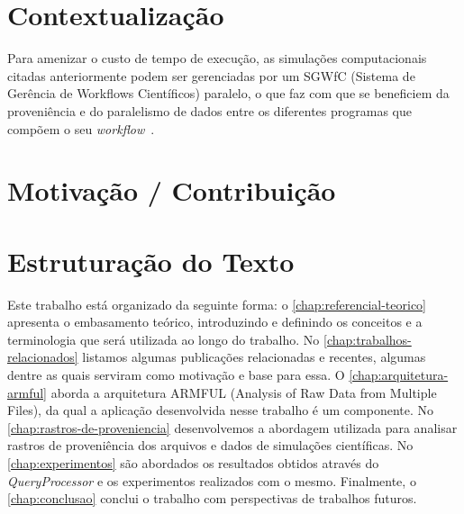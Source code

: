 \section{Contextualização}



Para amenizar o custo de tempo de execução, as simulações computacionais citadas anteriormente podem ser gerenciadas por um  SGWfC (Sistema de Gerência de Workflows Científicos) paralelo, o que faz com que se beneficiem da proveniência e do paralelismo de dados entre os diferentes programas que compõem o seu \textit{workflow}~\cite{bux2013parallelization}.



\section{Motivação / Contribuição} %



\section{Estruturação do Texto}

Este trabalho está organizado da seguinte forma:
o \autoref{chap:referencial-teorico} apresenta o embasamento teórico, introduzindo e definindo os conceitos e a terminologia que será utilizada ao longo do trabalho.
No \autoref{chap:trabalhos-relacionados} listamos algumas publicações relacionadas e recentes, algumas dentre as quais serviram como motivação e base para essa.
O \autoref{chap:arquitetura-armful} aborda a arquitetura  ARMFUL (Analysis of Raw Data from Multiple Files), da qual a aplicação desenvolvida nesse trabalho é um componente.
No \autoref{chap:rastros-de-proveniencia} desenvolvemos a abordagem utilizada para analisar rastros de proveniência dos arquivos e dados de simulações científicas.
No \autoref{chap:experimentos} são abordados os resultados obtidos através do \textit{QueryProcessor} e os experimentos realizados com o mesmo.
Finalmente, o \autoref{chap:conclusao} conclui o trabalho com perspectivas de trabalhos futuros.
